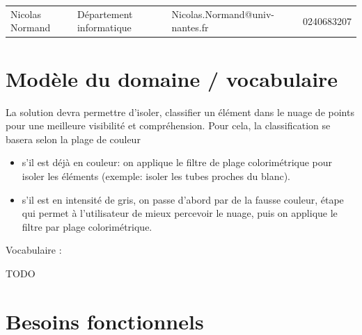 \documentclass[12pt,titlepage,french]{article}
\begin{document}
\noindent\begin{tabu} to \textwidth {X[c2]X[c2]X[c3]X[c]}\toprule
     &&                       &\\\toprule
Nicolas Normand& Département informatique&Nicolas.Normand@univ-nantes.fr&    0240683207\\\bottomrule
\end{tabu}

\section{Modèle du domaine / vocabulaire}

La solution devra permettre d’isoler, classifier un élément dans le nuage de points pour une meilleure visibilité et compréhension. Pour cela, la classification se basera selon la plage de couleur
\begin{itemize}
	\item  s'il est déjà en couleur: on applique le filtre de plage colorimétrique pour isoler les éléments (exemple: isoler les tubes proches du blanc).\par

	\item  s'il est en intensité de gris, on passe d'abord par de la fausse couleur, étape qui permet à l'utilisateur de mieux percevoir le nuage, puis on applique le filtre par plage colorimétrique.\par

\end{itemize}

Vocabulaire :

TODO

\section{Besoins fonctionnels}
\end{document}
